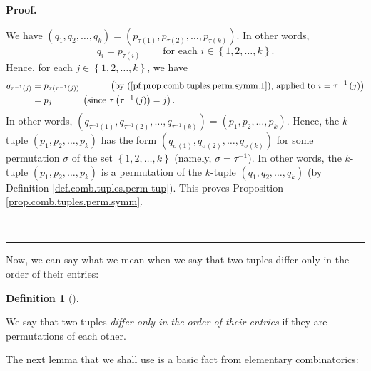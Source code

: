\documentclass[numbers=enddot,12pt,final,onecolumn,notitlepage]{scrartcl}%
\numberwithin{exer}{subsection}
\theoremstyle{definition}
\newtheorem{defi}[theo]{Definition}
\newenvironment{definition}[1][]
{\begin{defi}[#1]\begin{leftbar}}
{\end{leftbar}\end{defi}}
\newenvironment{fineprint}{\begin{small}}{\end{small}}
\newenvironment{proof}[1][Proof]{\noindent\textbf{#1.} }{\ \rule{0.5em}{0.5em}}
\begin{document}
\begin{proof}
\begin{fineprint}
We have $\left(  q_{1},q_{2},\ldots,q_{k}\right)  =\left(  p_{\tau\left(
1\right)  },p_{\tau\left(  2\right)  },\ldots,p_{\tau\left(  k\right)
}\right)  $. In other words,
\begin{equation}
q_{i}=p_{\tau\left(  i\right)  }\ \ \ \ \ \ \ \ \ \ \text{for each }%
i\in\left\{  1,2,\ldots,k\right\}  . \label{pf.prop.comb.tuples.perm.symm.1}%
\end{equation}
Hence, for each $j\in\left\{  1,2,\ldots,k\right\}  $, we have%
\begin{align*}
q_{\tau^{-1}\left(  j\right)  }  &  =p_{\tau\left(  \tau^{-1}\left(  j\right)
\right)  }\ \ \ \ \ \ \ \ \ \ \left(  \text{by
(\ref{pf.prop.comb.tuples.perm.symm.1}), applied to }i=\tau^{-1}\left(
j\right)  \right) \\
&  =p_{j}\ \ \ \ \ \ \ \ \ \ \left(  \text{since }\tau\left(  \tau^{-1}\left(
j\right)  \right)  =j\right)  .
\end{align*}
In other words, $\left(  q_{\tau^{-1}\left(  1\right)  },q_{\tau^{-1}\left(
2\right)  },\ldots,q_{\tau^{-1}\left(  k\right)  }\right)  =\left(
p_{1},p_{2},\ldots,p_{k}\right)  $. Hence, the $k$-tuple $\left(  p_{1}%
,p_{2},\ldots,p_{k}\right)  $ has the form $\left(  q_{\sigma\left(  1\right)
},q_{\sigma\left(  2\right)  },\ldots,q_{\sigma\left(  k\right)  }\right)  $
for some permutation $\sigma$ of the set $\left\{  1,2,\ldots,k\right\}  $
(namely, $\sigma=\tau^{-1}$). In other words, the $k$-tuple $\left(
p_{1},p_{2},\ldots,p_{k}\right)  $ is a permutation of the $k$-tuple $\left(
q_{1},q_{2},\ldots,q_{k}\right)  $ (by Definition
\ref{def.comb.tuples.perm-tup}). This proves Proposition
\ref{prop.comb.tuples.perm.symm}.
\end{fineprint}
\end{proof}

Now, we can say what we mean when we say that two tuples differ only in the
order of their entries:

\begin{definition}
We say that two tuples \textit{differ only in the order of their entries} if
they are permutations of each other.
\end{definition}

The next lemma that we shall use is a basic fact from elementary combinatorics:
\end{document}
